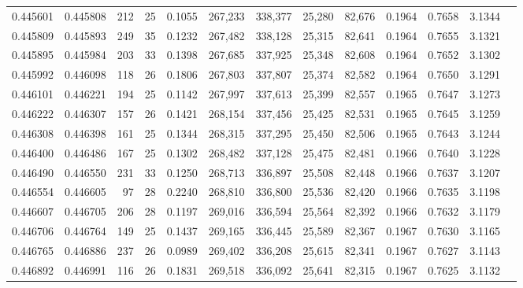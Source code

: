 \begin{tabular}{rrrrrrrrrrrrr}
0.445601 & 0.445808 & 212 &  25 &                                     0.1055 & 267,233 & 338,377 &  25,280 &  82,676 & 0.1964 & 0.7658 & 3.1344 \\
0.445809 & 0.445893 & 249 &  35 &                                     0.1232 & 267,482 & 338,128 &  25,315 &  82,641 & 0.1964 & 0.7655 & 3.1321 \\
0.445895 & 0.445984 & 203 &  33 &                                     0.1398 & 267,685 & 337,925 &  25,348 &  82,608 & 0.1964 & 0.7652 & 3.1302 \\
0.445992 & 0.446098 & 118 &  26 &                                     0.1806 & 267,803 & 337,807 &  25,374 &  82,582 & 0.1964 & 0.7650 & 3.1291 \\
0.446101 & 0.446221 & 194 &  25 &                                     0.1142 & 267,997 & 337,613 &  25,399 &  82,557 & 0.1965 & 0.7647 & 3.1273 \\
0.446222 & 0.446307 & 157 &  26 &                                     0.1421 & 268,154 & 337,456 &  25,425 &  82,531 & 0.1965 & 0.7645 & 3.1259 \\
0.446308 & 0.446398 & 161 &  25 &                                     0.1344 & 268,315 & 337,295 &  25,450 &  82,506 & 0.1965 & 0.7643 & 3.1244 \\
0.446400 & 0.446486 & 167 &  25 &                                     0.1302 & 268,482 & 337,128 &  25,475 &  82,481 & 0.1966 & 0.7640 & 3.1228 \\
0.446490 & 0.446550 & 231 &  33 &                                     0.1250 & 268,713 & 336,897 &  25,508 &  82,448 & 0.1966 & 0.7637 & 3.1207 \\
0.446554 & 0.446605 &  97 &  28 &                                     0.2240 & 268,810 & 336,800 &  25,536 &  82,420 & 0.1966 & 0.7635 & 3.1198 \\
0.446607 & 0.446705 & 206 &  28 &                                     0.1197 & 269,016 & 336,594 &  25,564 &  82,392 & 0.1966 & 0.7632 & 3.1179 \\
0.446706 & 0.446764 & 149 &  25 &                                     0.1437 & 269,165 & 336,445 &  25,589 &  82,367 & 0.1967 & 0.7630 & 3.1165 \\
0.446765 & 0.446886 & 237 &  26 &                                     0.0989 & 269,402 & 336,208 &  25,615 &  82,341 & 0.1967 & 0.7627 & 3.1143 \\
0.446892 & 0.446991 & 116 &  26 &                                     0.1831 & 269,518 & 336,092 &  25,641 &  82,315 & 0.1967 & 0.7625 & 3.1132 \\

\end{tabular}
